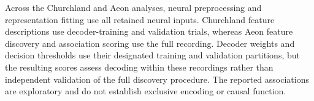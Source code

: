 Across the Churchland and Aeon analyses, neural preprocessing and representation fitting use all retained neural inputs. Churchland feature descriptions use decoder-training and validation trials, whereas Aeon feature discovery and association scoring use the full recording. Decoder weights and decision thresholds use their designated training and validation partitions, but the resulting scores assess decoding within these recordings rather than independent validation of the full discovery procedure. The reported associations are exploratory and do not establish exclusive encoding or causal function.

